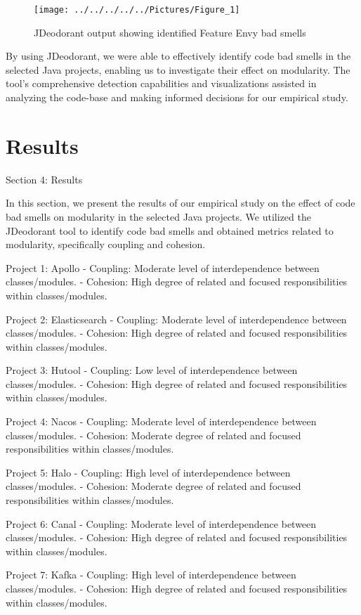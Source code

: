 \documentclass[conference]{IEEEtran}
\begin{document}
	\begin{figure}
		\centering
		\texttt{[image: ../../../../../Pictures/Figure\_1]}
		\caption{JDeodorant output showing identified Feature Envy bad smells}
		\label{}
	\end{figure}
	
	By using JDeodorant, we were able to effectively identify code bad smells in the selected Java projects, enabling us to investigate their effect on modularity. The tool's comprehensive detection capabilities and visualizations assisted in analyzing the code-base and making informed decisions for our empirical study.
	
	\section{Results}	
	Section 4: Results
	
	In this section, we present the results of our empirical study on the effect of code bad smells on modularity in the selected Java projects. We utilized the JDeodorant tool to identify code bad smells and obtained metrics related to modularity, specifically coupling and cohesion. 
	
	Project 1: Apollo
	- Coupling: Moderate level of interdependence between classes/modules.
	- Cohesion: High degree of related and focused responsibilities within classes/modules.
	
	Project 2: Elasticsearch
	- Coupling: Moderate level of interdependence between classes/modules.
	- Cohesion: High degree of related and focused responsibilities within classes/modules.
	
	Project 3: Hutool
	- Coupling: Low level of interdependence between classes/modules.
	- Cohesion: High degree of related and focused responsibilities within classes/modules.
	
	Project 4: Nacos
	- Coupling: Moderate level of interdependence between classes/modules.
	- Cohesion: Moderate degree of related and focused responsibilities within classes/modules.
	
	Project 5: Halo
	- Coupling: High level of interdependence between classes/modules.
	- Cohesion: Moderate degree of related and focused responsibilities within classes/modules.
	
	Project 6: Canal
	- Coupling: Moderate level of interdependence between classes/modules.
	- Cohesion: High degree of related and focused responsibilities within classes/modules.
	
	Project 7: Kafka
	- Coupling: High level of interdependence between classes/modules.
	- Cohesion: High degree of related and focused responsibilities within classes/modules.
	
\end{document}
